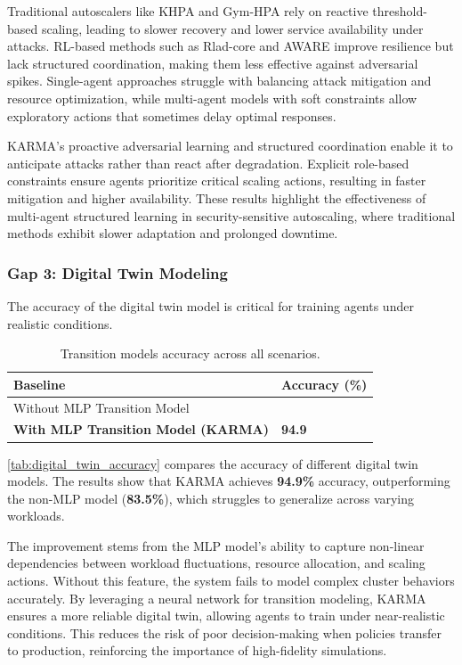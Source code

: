 Traditional autoscalers like KHPA and Gym-HPA rely on reactive threshold-based scaling, leading to slower recovery and lower service availability under attacks. RL-based methods such as Rlad-core and AWARE improve resilience but lack structured coordination, making them less effective against adversarial spikes. Single-agent approaches struggle with balancing attack mitigation and resource optimization, while multi-agent models with soft constraints allow exploratory actions that sometimes delay optimal responses.

KARMA's proactive adversarial learning and structured coordination enable it to anticipate attacks rather than react after degradation. Explicit role-based constraints ensure agents prioritize critical scaling actions, resulting in faster mitigation and higher availability. These results highlight the effectiveness of multi-agent structured learning in security-sensitive autoscaling, where traditional methods exhibit slower adaptation and prolonged downtime.


\subsubsection{Gap 3: Digital Twin Modeling}

The accuracy of the digital twin model is critical for training agents under realistic conditions.
\begin{table}[h]
    \centering
    \caption{Transition models accuracy across all scenarios.}
    \label{tab:digital_twin_accuracy}{
        \footnotesize
    \begin{tabular}{>{\raggedright\arraybackslash}m{6cm}>{\centering\arraybackslash}m{2cm}}
        \hline
        \textbf{Baseline} & \textbf{Accuracy (\%)} \\
        \hline
        Without MLP Transition Model & 83.5 \\
        \textbf{With MLP Transition Model (KARMA)} & \textbf{94.9} \\
        \hline
    \end{tabular}}
\end{table}

\autoref{tab:digital_twin_accuracy} compares the accuracy of different digital twin models. The results show that KARMA achieves \textbf{94.9\%} accuracy, outperforming the non-MLP model (\textbf{83.5\%}), which struggles to generalize across varying workloads.

The improvement stems from the MLP model's ability to capture non-linear dependencies between workload fluctuations, resource allocation, and scaling actions. Without this feature, the system fails to model complex cluster behaviors accurately.
%
By leveraging a neural network for transition modeling, KARMA ensures a more reliable digital twin, allowing agents to train under near-realistic conditions. This reduces the risk of poor decision-making when policies transfer to production, reinforcing the importance of high-fidelity simulations.




